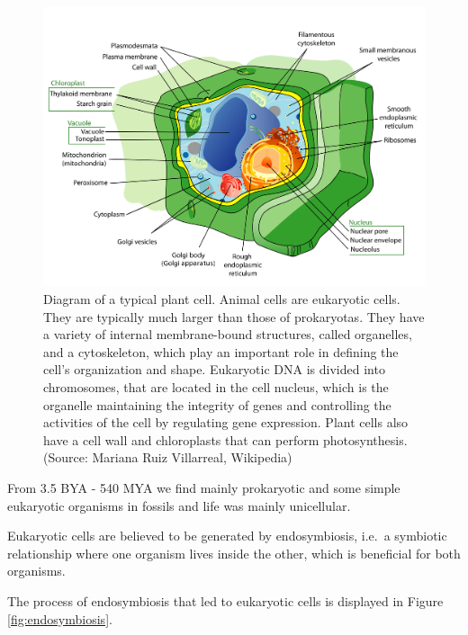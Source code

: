 \documentclass[
  11pt,
]{book}
\begin{document}
\begin{figure}

{\centering \includegraphics[width=0.5\linewidth]{./figs/plantCell} 

}

\caption{Diagram of a typical plant cell. Animal cells are eukaryotic cells. They are typically much larger than those of prokaryotas. They have a variety of internal membrane-bound structures, called organelles, and a cytoskeleton, which play an important role in defining the cell's organization and shape. Eukaryotic DNA is divided into chromosomes, that are located in the cell nucleus, which is the organelle maintaining the integrity of genes and controlling the activities of the cell by regulating gene expression. Plant cells also have a cell wall and chloroplasts that can perform photosynthesis. (Source: Mariana Ruiz Villarreal, Wikipedia)}\label{fig:plantCell}
\end{figure}

From 3.5 BYA - 540 MYA we find mainly prokaryotic and some simple eukaryotic organisms in fossils and life was mainly unicellular.

Eukaryotic cells are believed to be generated by endosymbiosis, i.e.~a symbiotic relationship where one organism lives inside the other, which is beneficial for both organisms.

The process of endosymbiosis that led to eukaryotic cells is displayed in Figure \ref{fig:endosymbiosis}.
\end{document}
